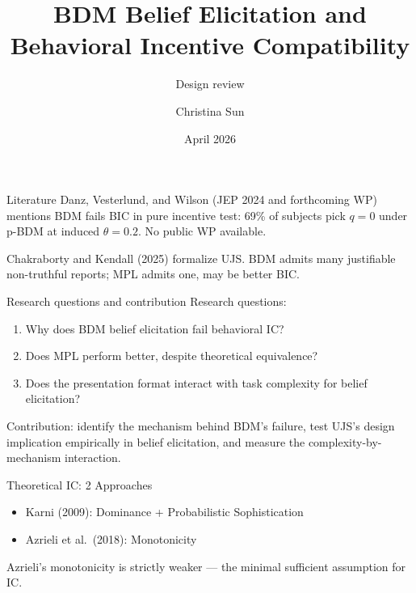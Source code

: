 \documentclass[11pt,aspectratio=169]{beamer}
\title{BDM Belief Elicitation and Behavioral Incentive Compatibility}
\subtitle{Design review}
\author{Christina Sun}
\date{April 2026}
\begin{document}
\begin{frame}[plain]
\maketitle
\end{frame}

\begin{frame}{Literature}
Danz, Vesterlund, and Wilson (JEP 2024 and forthcoming WP) mentions BDM fails BIC in pure incentive test: 69\% of subjects pick $q = 0$ under p-BDM at induced $\theta = 0.2$. No public WP available.

\vspace{0.6em}
Chakraborty and Kendall (2025) formalize UJS. BDM admits many justifiable non-truthful reports; MPL admits one, may be better BIC.

\end{frame}

\begin{frame}{Research questions and contribution}
Research questions:
\begin{enumerate}
\item Why does BDM belief elicitation fail behavioral IC?
\item Does MPL perform better, despite theoretical equivalence?
\item Does the presentation format interact with task complexity for belief elicitation?
\end{enumerate}

\vspace{0.8em}
Contribution: identify the mechanism behind BDM's failure, test UJS's design implication empirically in belief elicitation, and measure the complexity-by-mechanism interaction. 
\end{frame}

\begin{frame}{Theoretical IC: 2 Approaches}
    \begin{itemize}
        \item Karni (2009): Dominance + Probabilistic Sophistication
        \item Azrieli et al.\ (2018): Monotonicity
    \end{itemize}

    \vspace{0.5em}
    Azrieli's monotonicity is strictly weaker --- the minimal sufficient assumption for IC.
\end{frame}
\end{document}
